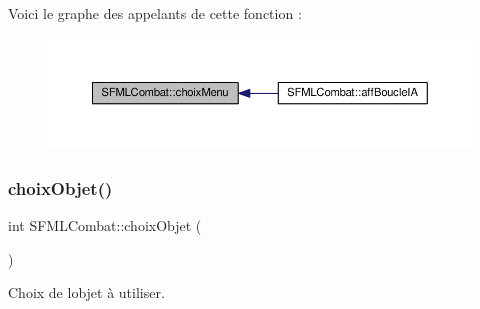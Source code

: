 Voici le graphe des appelants de cette fonction \+:\nopagebreak
\begin{figure}[H]
\begin{center}
\leavevmode
\includegraphics[width=350pt]{class_s_f_m_l_combat_ad72f480db9eb3f134e3736b1acb228c8_icgraph}
\end{center}
\end{figure}
\mbox{\label{class_s_f_m_l_combat_aa22c1c2665846e97e2eef331af8420d1}} 
\subsubsection{\texorpdfstring{choix\+Objet()}{choixObjet()}}
{\footnotesize\ttfamily int S\+F\+M\+L\+Combat\+::choix\+Objet (\begin{DoxyParamCaption}{ }\end{DoxyParamCaption})\hspace{0.3cm}{\ttfamily [private]}}



Choix de l\textquotesingle{}objet à utiliser. 

